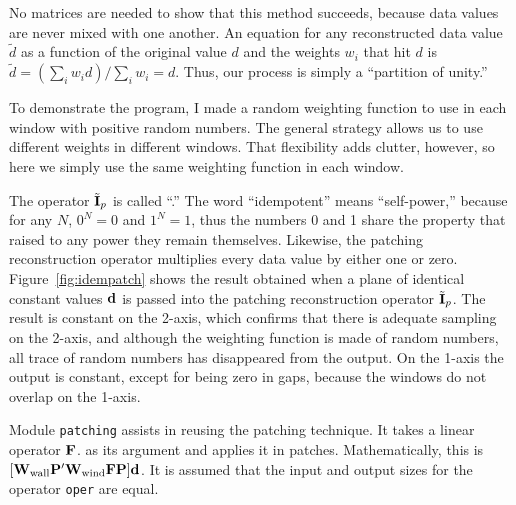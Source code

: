 \par
No matrices are needed to show that this method succeeds,
because data values are never mixed with one another.
An equation for any reconstructed data value $\tilde d$
as a function of the original value $d$ and the weights $w_i$
that hit $d$ is $\tilde d = (\sum_i w_i d) / \sum_i w_i = d$.
Thus, our process is simply a ``partition of unity.''

\par
To demonstrate the program,
I made a random weighting function
to use in each window with positive random numbers.
The general strategy allows us to use different weights in different windows.
That flexibility adds clutter, however,
so here we simply use the same weighting function in each window.


\par
The operator
$\tilde{\bold I}_p$
is called ``.''
The word ``idempotent'' means ``self-power,'' because
for any $N$,  $0^N=0$ and $1^N=1$,
thus the numbers 0 and 1 share the property that raised
to any power they remain themselves.
Likewise, the patching reconstruction operator
multiplies every data value by either one or zero.
Figure~\ref{fig:idempatch} shows the result
obtained when a plane of identical constant values $\bold d$
is passed into the patching reconstruction operator $\tilde{\bold I}_p$.
The result is constant on the 2-axis, which confirms
that
there is adequate sampling on the 2-axis,
and although the weighting function is made of random numbers,
all trace of random numbers has disappeared from the output.
On the 1-axis the output is constant,
except for being zero in gaps,
because the windows do not overlap on the 1-axis.


\par
Module \texttt{patching} assists in reusing the patching technique. It
takes a linear operator $\bold F$.
as its argument and applies it in patches.
Mathematically, this is
$ [\bold W_{\rm wall} \bold P' \bold W_{\rm wind} \bold F \bold P ] \bold d$.
It is assumed that the input and output sizes for the operator
\texttt{oper} are equal.

